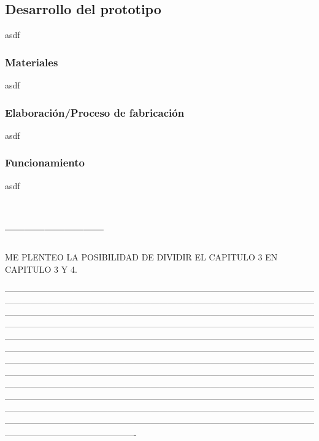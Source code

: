 \subsection{Desarrollo del prototipo}
\label{sec:prot3IMU}
asdf

\subsubsection{Materiales}
asdf


\subsubsection{Elaboración/Proceso de fabricación}
asdf

\subsubsection{Funcionamiento}
asdf




\section{---------------}

ME PLENTEO LA POSIBILIDAD DE DIVIDIR EL CAPITULO 3 EN CAPITULO 3 Y 4.


----------------------------------------------------------------------------------------------------------------------------------------------------------------------------------------------------------------------------------------------------------------------------------------------------------------------------------------------------------------------------------------------------------------------------------------------------------------------------------------------------------------------------------------------------------------------------------------------------------------------------------------------------------------------------------------------------------------------------------------------------------------------------------------------------------------------------------------------------------------------------------------------------------------------------------------------------------------------------------------------------------------------------------------------------------------------------------------------------------------------------------------------------------------------------------------------------------------------------------------------------------------------------------------------------------------------------------------------------------------------------------------------


